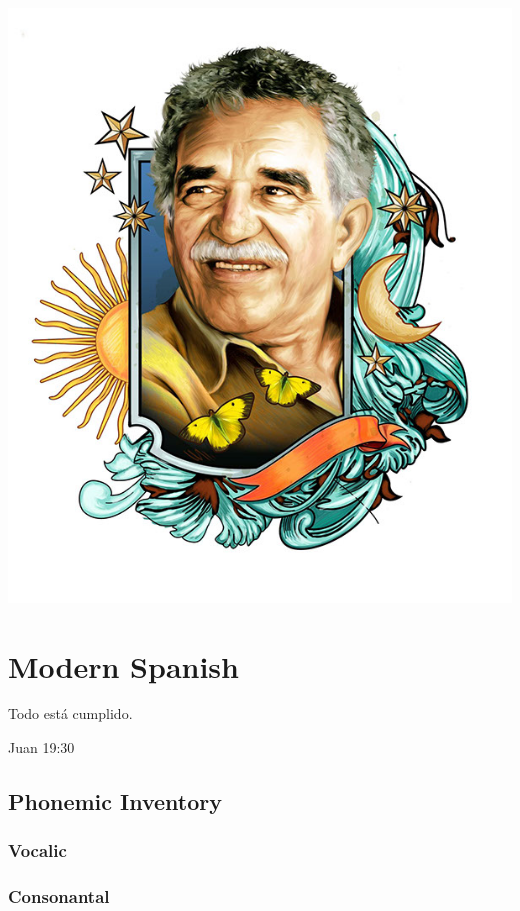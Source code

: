 \documentclass{report}[12pt]
\begin{document}
\includegraphics[scale=0.75]{marquez.jpg}

\thispagestyle{empty}

\pagebreak

\chapter{Modern Spanish}

\epigraph{Todo está cumplido.}{Juan 19:30}

\section{Phonemic Inventory}

\subsection{Vocalic}

\subsection{Consonantal}
\end{document}
